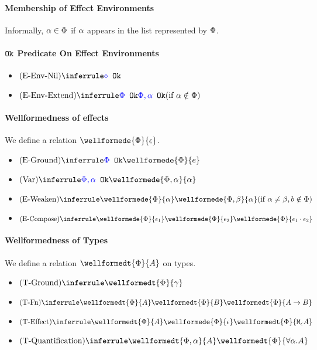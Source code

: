 \documentclass{report}
\begin{document}
\paragraph{Membership of Effect Environments}
Informally, $\a \in \P$ if $\a$ appears in the list represented by $\P$.

\paragraph{$\okt$ Predicate On Effect Environments}
\begin{itemize}
    \item $\ntreerulez{\pnil}{\ok{\nil}}$
    \item $\condtreeruleI{\pextend}{\ok{\P}}{\ok{\P, \a}}{ \a\notin \P}$
\end{itemize}

\paragraph{Wellformedness of effects}
We define a relation $\wellformede{\P}{\e}$.

\begin{itemize}
    \item $\ntreeruleI{\eground}{\ok{\P}}{\wellformede{\P}{e}}$
    \item $\ntreeruleI{\vvar}{\ok{\P,\a}}{\wellformede{\P,\a}{\a}}$
    \item $\condtreeruleI{\eweaken}{\wellformede{\P}{\a}}{\wellformede{\P,\b}{\a}}{\a\neq\b, b\notin\P}$
    \item $\ntreeruleII{\ecompose}{\wellformede{\P}{\e_1}}{\wellformede{\P}{\e_2}}{\wellformede{\P}{\e_1\dot\e_2}}$
\end{itemize}

\paragraph{Wellformedness of Types}
We define a relation $\wellformedt{\P}{A}$ on types.

\begin{itemize}
    \item $\ntreerulez{\tground}{\wellformedt{\P}{\g}}$
    \item $\ntreeruleII{\tfun}{\wellformedt{\P}{A}}{\wellformedt{\P}{B}}{\wellformedt{\P}{\ab}}$
    \item $\ntreeruleII{\teffect}{\wellformedt{\P}{A}}{\wellformede{\P}{\e}}{\wellformedt{\P}{\mea}}$
    \item $\ntreeruleI{\tquant}{\wellformedt{\P,\a}{A}}{\wellformedt{\P}{\all{\a}{A}}}$
\end{itemize}
\end{document}
